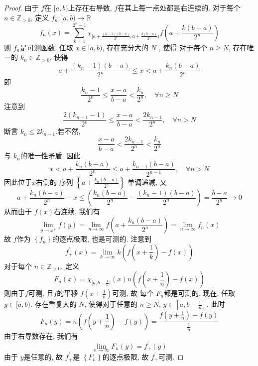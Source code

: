 \documentclass[../main.tex]{subfiles}
\begin{document}
\begin{proof}
   由于 \(  f  \)在 \(  [a,b)  \)上存在右导数,  \(  f  \)在其上每一点处都是右连续的.  对于每个 \(  n \in \mathbb{Z} _{> 0}  \), 定义 \(  f_{n}:[a,b)\to \mathbb{R}   \) \[
   f_{n}\left( x \right)=\sum _{k= 1}^{2^{n}-1}\chi _{[a+ \frac{\left( k-1 \right)\left( b-a \right)   }{2^{n} }, a+ \frac{k\left( b-a \right)  }{2^{n}}  )}f\left( a+ \frac{k\left( b-a \right)  }{2^{n} } \right) 
   \] 则 \(  f_{n}  \)是可测函数. 任取 \(  x \in [a,b)  \), 存在充分大的 \(  N\) , 使得 对于每个 \(  n \ge N \), 存在唯一的 \(  k_{n} \in \mathbb{Z} _{> 0}  \), 使得 \[
   a+ \frac{\left( k_{n}-1 \right)  \left( b-a \right) }{2^{n} } \le x< a+ \frac{k_{n}\left( b-a \right)  }{2^{n} } 
   \]  即 \[
   \frac{k_{n}-1 }{ 2^{n}}\le \frac{x-a }{b-a }<  \frac{k_{n} }{2^{n} },\quad \forall n\ge  N
   \] 注意到 \[
   \frac{2\left( k_{n-1}-1 \right)  }{2^{n} }\le \frac{x-a }{b-a }<  \frac{2k_{n-1} }{2^{n} }   ,\quad \forall n> N
   \]断言 \(  k_{n}\le 2k_{n-1}  \).若不然,  \[
   \frac{x-a }{b-a }< \frac{2k_{n-1} }{2^{n} }< \frac{k_{n} }{2^{n} }  
   \] 与 \(  k_{n}  \)的唯一性矛盾.  因此 \[
 x<  a+ \frac{k_{n} \left( b-a \right) }{2^{n} }\le a+  \frac{k_{n-1}\left( b-a \right)  }{2^{n-1} }  ,\quad \forall n > N
   \]因此位于\(  x  \)右侧的 序列 \(  \left\{ a+ \frac{k_{n} \left( b-a \right) }{2^{n} }  \right\}  \) 单调递减, 又 \[
   a+ \frac{k_{n} \left( b-a \right) }{2^{n} }-x\le  \left( \frac{k_{n}\left( b-a \right) }{2^{n} }-\frac{\left( k_{n}-1 \right) \left( b-a \right) }{2^{n} }   \right)= \frac{b-a }{2^{n} }\to 0
   \]  从而由于 \( f\left( x \right)   \)右连续, 我们有 \[
   \lim_{y\to x^{+ }}f\left( y \right)= \lim_{n\to \infty}f\left(a+  \frac{k_{n} \left( b-a \right) }{2^{n} }  \right)  = \lim_{n\to \infty}f_{n}\left( x \right) 
   \]故 \(  f  \)作为 \(  \left\{ f_{n} \right\}  \)的逐点极限, 也是可测的.   注意到\[
    f_{+ }^{\prime} \left( x \right)= \lim_{k\to \infty}k\left( f\left( x+ \frac{1 }{k }  \right)-f\left( x \right) \right) \]
    对于每个 \(  n \in \mathbb{Z} _{> 0}  \), 定义  \[
    F_{n}\left( x \right)= \chi _{[a,b-\frac{1 }{n } )} \left( x \right) n \left( f\left( x+ \frac{1 }{n }  \right)-f\left( x \right)   \right)  
    \]则由于\(  f  \)可测, 且\(  f  \)的平移 \(  f\left( x+ \frac{1 }{n }  \right)   \)可测, 故   每个 \(  F_{n}  \)都是可测的. 现在, 任取 \(  y\in [a,b)  \). 存在重复大的 \(  N  \), 使得对于任意的 \(  n\ge N  \), \(  y\in [a,b-\frac{1 }{n } ]  \). 此时 \[
    F_{n}\left( y \right)= n \left( f\left( y+ \frac{1 }{n }  \right)-f\left( y \right)   \right)  = \frac{f\left( y+ \frac{1 }{n }  \right)-f\left( y \right)   }{ \frac{1 }{n } } 
    \]    由于右导数存在, 我们有 \[
    \lim_{n\to \infty}F_{n}\left( y \right)= f^{\prime} _{+ }\left( y \right)  
    \]由于 \(  y  \)是任意的, 故 \(  f_{+ }^{\prime}   \)是 \(  \left\{ F_{n} \right\}  \)的逐点极限, 故 \(  f_{+ }^{\prime}   \)可测.    
\end{proof}
\end{document}
